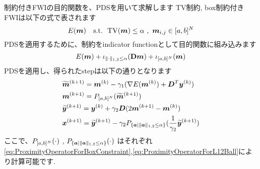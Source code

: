 制約付きFWIの目的関数を、PDSを用いて求解します
TV制約, box制約付きFWIは以下の式で表されます
\begin{equation} \label{eq:FWIObjectiveWithTVConstraint} \FWIObjectiveWithTVConstraint \end{equation}
PDSを適用するために、制約をindicator functionとして目的関数に組み込みます
\begin{equation} \label{eq:FWIObjectiveWithTVConstraintWithIndicatorFunction} \FWIObjectiveWithTVConstraintWithIndicatorFunction \end{equation}
PDSを適用し、得られたstepは以下の通りとなります
\begin{equation} \label{eq:FWIWithPDS} \FWIWithPDS \notag \end{equation}
ここで、$\projBox{\cdot}$ , $\projLOneTwoBall{\cdot}$ はそれぞれ\eqref{eq:ProximityOperatorForBoxConstraint},\eqref{eq:ProximityOperatorForL12Ball}により計算可能です.